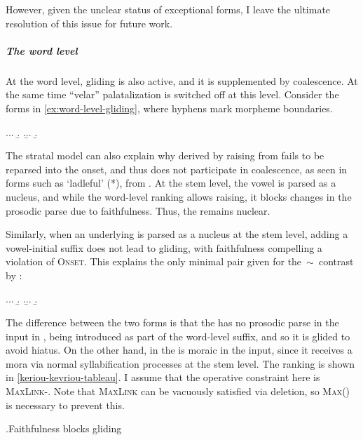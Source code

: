 However, given the unclear status of exceptional forms, I leave the ultimate resolution of this issue for future work.

\subparagraph{The word level}
\label{sec:word-level}

At the word level, gliding is also active, and it is supplemented by coalescence. At the same time \enquote{velar} palatalization is switched off at this level. Consider the forms in \cref{ex:word-level-gliding}, where hyphens mark morpheme boundaries.

\ex.\label{ex:word-level-gliding}\a.\a.
\b.
\z.\b.\a.
\b.\mbi{[ˈkwæʒəw]}


The stratal model can also explain why \ipa{[i]} derived by raising from \ipa{[e]} fails to be reparsed into the onset, and thus does not participate in coalescence, as seen in forms such as \mbox{\ipa{[ˈklɒːɡiad̥]}} `ladleful' (*\ipa{[ˈklɒːdʒad̥]}), from \ipa{[ˈklɒːɡe]}. At the stem level, the vowel \ipa{[e]} is parsed as a nucleus, and while the word-level ranking allows raising, it blocks changes in the prosodic parse due to faithfulness. Thus, the \ipa{[i]} remains nuclear.

Similarly, when an underlying \ipa{[i]} is parsed as a nucleus at the stem level, adding a vowel-initial suffix does not lead to gliding, with faithfulness compelling a violation of \textsc{Onset}. This explains the only minimal pair given for the \ipa{[i]}\,$\sim$\,\ipa{[j]} contrast by \citet[p.~166]{humphreys95:_phonol_bothoa_saint_nicol_pelem}:

\ex.\a.\label{ex:keriou}\a.
\b.
\z.\b.\label{ex:kevriou}\a.
\b.

The difference between the two forms is that the \ipa{[i]} has no prosodic parse in the input in \ipa{[ʧɛːrjəw]}, being introduced as part of the word-level suffix, and so it is glided to avoid hiatus. On the other hand, in \ipa{[ˈʧɛːriəw]} the \ipa{[i]} is moraic in the input, since it receives a mora via normal syllabification processes at the stem level. The ranking is shown in \ref{keriou-kevriou-tableau}. I assume that the operative constraint here is \textsc{MaxLink}-\mo[V]. Note that \textsc{MaxLink} can be vacuously satisfied via deletion, so \textsc{Max}() is necessary to prevent this.

\ex.\label{keriou-kevriou-tableau}Faithfulness blocks gliding\\

